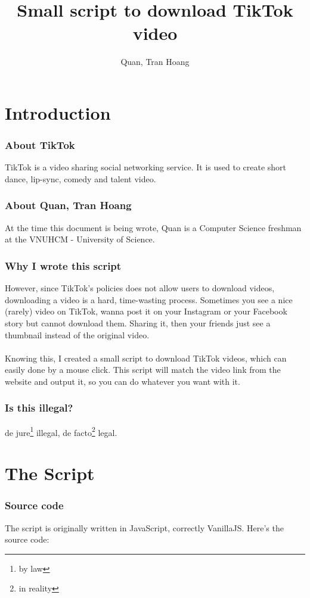 \documentclass{article}
\begin{document}
\author{Quan, Tran Hoang}
\title{Small script to download TikTok video}
\maketitle{}

\tableofcontents{}\newpage

\part{Introduction}
\section{About TikTok}
TikTok is a video sharing social networking service. It is used to create short dance, lip-sync, comedy and talent video\cite{WikipediaTikTok}.
\section{About Quan, Tran Hoang}
At the time this document is being wrote, Quan is a Computer Science freshman at the VNUHCM - University of Science\cite{aboutquan}\cite{aboutquanblog}.
\section{Why I wrote this script}
However, since TikTok's policies does not allow users to download videos, downloading a video is a hard, time-wasting process. Sometimes you see a nice (rarely) video on TikTok, wanna post it on your Instagram or your Facebook story but cannot download them. Sharing it, then your friends just see a thumbnail instead of the original video.
\\\\
Knowing this, I created a small script to download TikTok videos, which can easily done by a mouse click. This script will match the video link from the website and output it, so you can do whatever you want with it.
\section{Is this illegal?}
de jure\footnote{by law} illegal, de facto\footnote{in reality} legal.

\part{The Script}
\section{Source code}\label{codeexplain}
The script is originally written in JavaScript, correctly VanillaJS\cite{vanillajs}. Here's the source code:
\end{document}
